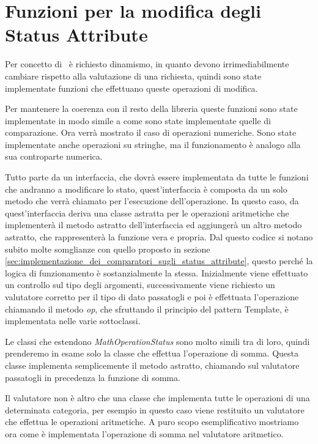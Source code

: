 \section{Funzioni per la modifica degli Status Attribute} %
\label{sec:funzioni_aritmetiche_per_la_modifica_degli_statusattribute}
Per concetto di \statusattribute \ è  richiesto dinamismo, in quanto devono irrimediabilmente cambiare rispetto alla valutazione di una richiesta, quindi sono state implementate funzioni che effettuano queste operazioni di modifica.\\ \par
Per mantenere la coerenza con il resto della libreria queste funzioni sono state implementate in modo simile a come sono state implementate quelle di comparazione.
Ora verrà mostrato il caso di operazioni numeriche. Sono state implementate anche operazioni su stringhe, ma il funzionamento è analogo alla sua controparte numerica.\\ \par
{}
Tutto parte da un interfaccia, che dovrà essere implementata da tutte le funzioni che andranno a modificare lo stato, quest'interfaccia è composta da un solo metodo che verrà chiamato per l'esecuzione dell'operazione.
In questo caso, da quest'interfaccia deriva una classe astratta per le operazioni aritmetiche che implementerà il metodo astratto dell'interfaccia ed aggiungerà un altro metodo astratto, che rappresenterà la funzione vera e propria.
Dal questo codice si notano subito molte somglianze con quello proposto in sezione \ref{sec:implementazione_dei_comparatori_sugli_status_attribute}, questo perché la logica di funzionamento è sostanzialmente la stessa.
Inizialmente viene effettuato un controllo sul tipo degli argomenti, successivamente viene richiesto un valutatore corretto per il tipo di dato passatogli e poi è effettuata l'operazione chiamando il metodo \textit{op}, che sfruttando il principio del pattern Template, è implementata nelle varie sottoclassi.\\ \par
Le classi che estendono \textit{MathOperationStatus} sono molto simili tra di loro, quindi prenderemo in esame solo la classe che effettua l'operazione di somma.
Questa classe implementa semplicemente il metodo astratto, chiamando sul valutatore passatogli in precedenza la funzione di somma.\\ \par
Il valutatore non è altro che una classe che implementa tutte le operazioni di una determinata categoria, per esempio in questo caso viene restituito un valutatore che effettua le operazioni aritmetiche.
A puro scopo esemplificativo mostriamo ora come è implementata l'operazione di somma nel valutatore aritmetico.

